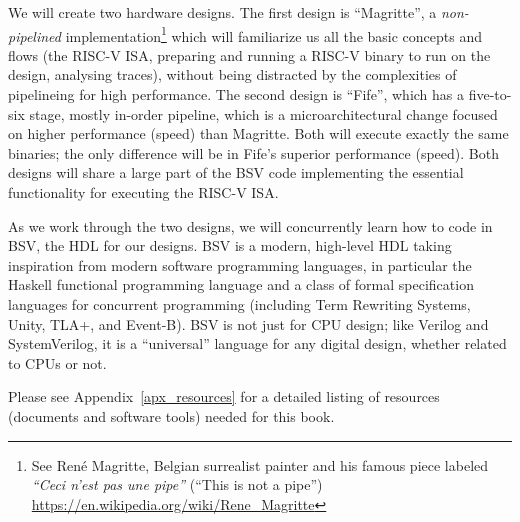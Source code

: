 We will create two hardware designs.  The first design is
``Magritte'', a \emph{non-pipelined} implementation\footnote{ See
Ren\'e Magritte, Belgian surrealist painter and his famous piece
labeled \emph{``Ceci n'est pas une pipe''} (``This is not a pipe'')
\url{https://en.wikipedia.org/wiki/Rene_Magritte}} which will
familiarize us all the basic concepts and flows (the RISC-V ISA,
preparing and running a RISC-V binary to run on the design, analysing
traces), without being distracted by the complexities of pipelineing
for high performance.  The second design is ``Fife'', which has a
five-to-six stage, mostly in-order pipeline, which is a
microarchitectural change focused on higher performance (speed) than
Magritte.  Both will execute exactly the same binaries; the only
difference will be in Fife's superior performance (speed).  Both
designs will share a large part of the BSV code implementing the
essential functionality for executing the RISC-V ISA.

As we work through the two designs, we will concurrently learn how to
code in BSV, the HDL for our designs.  BSV is a modern, high-level HDL
taking inspiration from modern software programming languages, in
particular the Haskell functional programming language and a class of
formal specification languages for concurrent programming (including
Term Rewriting Systems, Unity, TLA+, and Event-B).  BSV is not just
for CPU design; like Verilog and SystemVerilog, it is a ``universal''
language for any digital design, whether related to CPUs or not.

Please see Appendix~\ref{apx_resources} for a detailed listing of
resources (documents and software tools) needed for this book.

